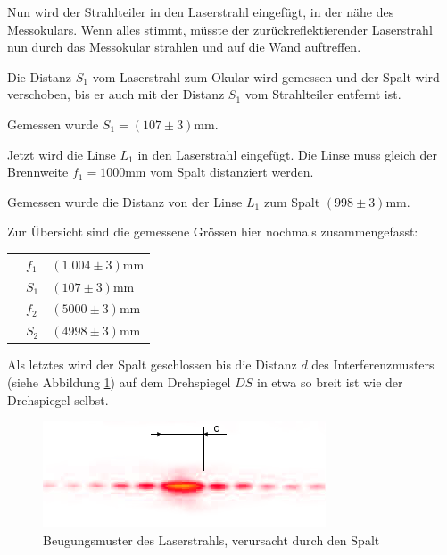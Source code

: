 Nun  wird  der  Strahlteiler  in  den Laserstrahl eingef\"ugt, in der n\"ahe des
Messokulars. Wenn alles stimmt, m\"usste der zur\"uckreflektierender Laserstrahl
nun   durch   das   Messokular   strahlen   und   auf   die   Wand   auftreffen.

Die  Distanz  $S_1$  vom Laserstrahl zum Okular wird gemessen und der Spalt wird
verschoben,  bis  er  auch  mit der Distanz $S_1$ vom Strahlteiler entfernt ist.

Gemessen wurde $S_1 = (107\pm3)\textrm{mm}$.

Jetzt wird die Linse $L_1$ in den Laserstrahl eingef\"ugt. Die Linse muss gleich
der   Brennweite   $f_1   =   1000\textrm{mm}$  vom  Spalt  distanziert  werden.

Gemessen wurde die Distanz von der Linse $L_1$ zum Spalt $(998\pm3)\textrm{mm}$.

Zur \"Ubersicht sind die gemessene Gr\"ossen hier nochmals zusammengefasst:

\begin{tabular}{lp{25mm}l}
    \hspace{4mm}
    & $f_1$ & $(1.004\pm3)\textrm{mm}$ \\
    & $S_1$ & $(107\pm3)\textrm{mm}$ \\
    & $f_2$ & $(5000\pm3)\textrm{mm}$ \\
    & $S_2$ & $(4998\pm3)\textrm{mm}$ \\
\end{tabular}

Als   letztes   wird   der   Spalt   geschlossen   bis   die   Distanz  $d$  des
Interferenzmusters  (siehe  Abbildung \ref{fig:diffraction}) auf dem Drehspiegel
$DS$    in    etwa    so    breit    ist    wie    der    Drehspiegel    selbst.

\begin{figure}[H]
    \center
    \includegraphics[width=.9\textwidth]{images/diffraction.png}
    \caption{Beugungsmuster des Laserstrahls, verursacht durch den Spalt}
    \label{fig:diffraction}
\end{figure}

